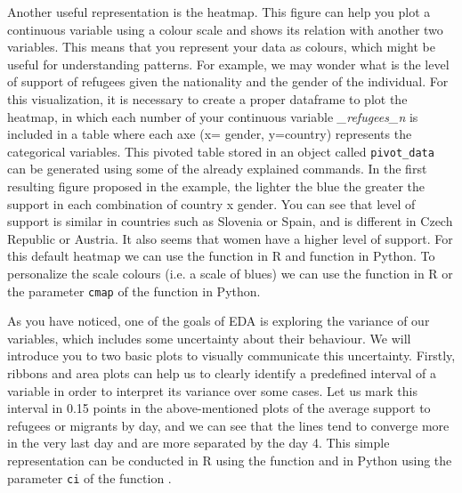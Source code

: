 Another useful representation is the heatmap. This figure can help you plot a continuous variable using a colour scale and shows its relation with another two variables.  This means that you represent your data as colours, which might be useful for understanding patterns. For example, we may wonder what is the level of support of refugees given the nationality and the gender of the individual. For this visualization, it is necessary to create a proper dataframe to plot the heatmap, in which each number of your continuous variable \emph{\_refugees\_n} is included in a table where each axe (x= gender, y=country) represents the categorical variables. This pivoted table stored in an object called \texttt{pivot\_data} can be generated using some of the already explained commands.  In the first resulting figure proposed in the example, the lighter the blue the greater the support in each combination of country x gender. You can see that level of support is similar in countries such as Slovenia or Spain, and is different in Czech Republic or Austria. It also seems that women have a higher level of support. For this default heatmap we can use the  function  in R and  function  in Python.  To personalize the scale colours (i.e. a scale of blues) we can use the  function  in R or the parameter \texttt{cmap} of the  function  in Python. 


As you have noticed, one of the goals of EDA is exploring the variance of our variables, which includes some uncertainty about their behaviour. We will introduce you to two basic plots to visually communicate this uncertainty. Firstly, ribbons and area plots can help us to clearly identify a predefined interval of a variable in order to interpret its variance over some cases. Let us mark this interval in 0.15 points in the above-mentioned plots of the average support to refugees or migrants by day, and we can see that the lines tend to converge more in the very last day and are more separated by the day 4. This simple representation can be conducted in R using the  function  and in Python using the parameter \texttt{ci} of the  function .  


